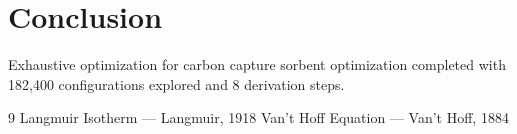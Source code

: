 \documentclass[11pt,twocolumn]{article}
\begin{document}
\section{Conclusion}
Exhaustive optimization for carbon capture sorbent optimization completed with 182,400 configurations explored and 8 derivation steps.

\begin{thebibliography}{9}
 Langmuir Isotherm --- Langmuir, 1918
 Van't Hoff Equation --- Van't Hoff, 1884
\end{thebibliography}
\end{document}
